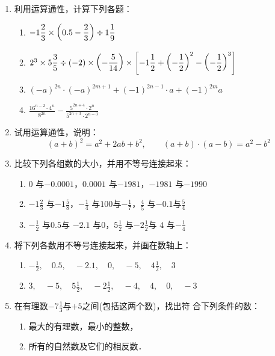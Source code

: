 \begin{enumerate}
    \item 利用运算通性，计算下列各题：
\begin{enumerate}
    \item $-1\dfrac{2}{3}\times \left(0.5-\dfrac{2}{3}\right)\div 1\dfrac{1}{9}$
    \item $2^3\times 5\dfrac{3}{5}\div (-2)\times\left(-\dfrac{5}{14}\right)\times \left[-1\dfrac{1}{2}+\left(-\dfrac{1}{2}\right)^2-\left(-\dfrac{1}{2}\right)^3\right]$
    \item $(-a)^{2n}\cdot (-a)^{2m+1}+(-1)^{2n-1}\cdot a+(-1)^{2m}a$
    \item $\frac{16^{n-2}\cdot 4^n}{8^{2n}}-\frac{5^{2n+4}\cdot 2^n}{5^{2n+3}\cdot 2^{n-3}}$
\end{enumerate}

\item 试用运算通性，说明：
\[(a+b)^2=a^2+2ab+b^2,\qquad (a+b)\cdot (a-b)=a^2-b^2 \]
\item 比较下列各组数的大小，并用不等号连接起来：
\begin{enumerate}
    \item $0$ 与$-0.0001$，\quad $0.0001$ 与$-1981$，\quad $-1981$ 与$-1990$ 
    \item $-1\frac{2}{3}$ 与$-1\frac{5}{8}$，\quad $-\frac{1}{4}$ 与$100$与$-\frac{1}{7}$，\quad $\frac{4}{5}$ 与$-0.1$与$\frac{5}{4}$
    \item  $-\frac{1}{2}$ 与$0.5$与 $-2.1$ 与$0$，\quad $5\frac{1}{2}$ 与$-2\frac{1}{2}$与 $4$ 与$-\frac{1}{4}$ 
\end{enumerate}

\item 将下列各数用不等号连接起来，并画在数轴上：
\begin{enumerate}
    \item $-\frac{1}{2},\quad  0.5 ,\quad -2.1  ,\quad 0  ,\quad -5  ,\quad  4\frac{1}{2} ,\quad 3  $
    \item $3,\quad  -5 ,\quad 5\frac{1}{2}  ,\quad  -2\frac{1}{2} ,\quad  -4 ,\quad  4 ,\quad  0 ,\quad  -3 $
\end{enumerate}

\item  在有理数$-7\frac{1}{3}$与$+5$之间(包括这两个数)，找出符
合下列条件的数：
\begin{enumerate}
    \item 最大的有理数，最小的整数，
    \item 所有的自然数及它们的相反数．
\end{enumerate}


\end{enumerate}
